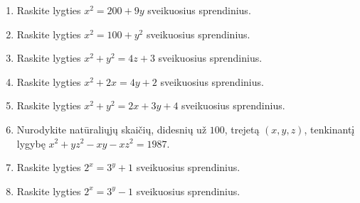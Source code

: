 \begin{enumerate}
  \item Raskite lygties $x^2 = 200 + 9y$ sveikuosius sprendinius.
  \item Raskite lygties $x^2 = 100 + y^2$ sveikuosius sprendinius.
  \item Raskite lygties $x^2 + y^2 = 4z + 3$ sveikuosius sprendinius.
  \item Raskite lygties $x^2 + 2x = 4y + 2$ sveikuosius sprendinius.
  \item Raskite lygties $x^2 + y^2 = 2x + 3y + 4$ sveikuosius sprendinius.
  \item \text{[LitMo 1987]} Nurodykite natūraliųjų skaičių, didesnių už
    $100$, trejetą $(x, y, z)$, tenkinantį lygybę $x^2 + yz^2-xy-xz^2 =
    1987.$
  \item Raskite lygties $2^x = 3^y + 1$ sveikuosius sprendinius.
  \item Raskite lygties $2^x = 3^y - 1$ sveikuosius sprendinius.

\end{enumerate}
